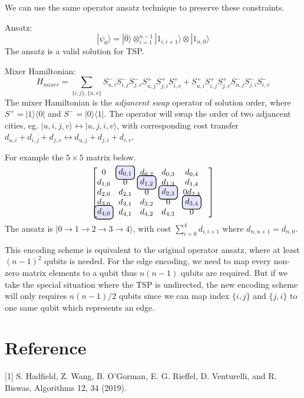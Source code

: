 \documentclass[%
aps, %
prl, %
preprint, %
12pt, %
amsfonts, %
amssymb, %
amsmath, %
endfloats,%
notitlepage, %
raggedbottom, %
]{revtex4-1}
\newcommand{\bra}[1]{|#1\rangle}
\newcommand\hlight[1]{\tikz[overlay, remember picture,baseline=-\the\dimexpr\fontdimen22\textfont2\relax]\node[rectangle,fill=blue!50,rounded corners,fill opacity = 0.2,draw,thick,text opacity =1] {$#1$};}
\begin{document}
We can use the same operator ansatz technique to preserve these constraints.

Ansatz:
$$
|\psi_0\rangle=|\bar 0\rangle \otimes_{i=1}^{n-1} |1_{i,i+1}\rangle\otimes\bra{1_{n,0}}
$$
The ansatz is a valid solution for TSP.

Mixer Hamiltonian:
$$
H_{mixer}=\sum_{\{i,j\},\{u,v\}} S^-_{u,i}S^-_{i,j}S^-_{j,v}S^+_{u,j}S^+_{j,i}S^+_{i,v}+S^+_{u,i}S^+_{i,j}S^+_{j,v}S^-_{u,j}S^-_{j,i}S^-_{i,v}
$$
The mixer Hamiltonian is the \textit{adjancent swap} operator of solution order, where $S^+=|1\rangle\langle 0|$ and $S^-=|0\rangle\langle 1|$.
The operator will swap the order of two adjancent cities, eg.
$|u,i,j,v\rangle \leftrightarrow |u,j,i,v\rangle$, with corresponding cost transfer $d_{u,i}+d_{i,j}+d_{j,v} \leftrightarrow d_{u,j}+d_{j,i}+d_{i,v}$.

For example the $5\times 5$ matrix below.
$$
\begin{bmatrix}
    0&\hlight{d_{0,1}}&d_{0,2}&d_{0,3}&d_{0,4}&\\
    d_{1,0}&0&\hlight{d_{1,2}}&d_{1,3}&d_{1,4}&\\
    d_{2,0}&d_{2,1}&0&\hlight{d_{2,3}}&0d_{2,4}&\\
    d_{3,0}&d_{3,1}&d_{3,2}&0&\hlight{d_{3,4}}&\\
    \hlight{d_{4,0}}&d_{4,1}&d_{4,2}&d_{4,3}&0&\\
\end{bmatrix}
$$
The ansatz is $\bra{0\rightarrow 1 \rightarrow 2\rightarrow 3\rightarrow 4}$, with cost $\sum_{i=0}^4 d_{i,i+1}$ where $d_{n,n+1}=d_{n,0}$.

This encoding scheme is equivalent to the original operator ansatz, where at least $(n-1)^2$ qubits is needed. For the edge encoding, we need to map every non-zero matrix elements to a qubit thus $n(n-1)$ qubits are required. But if we take the special situation where the TSP is undirected, the new encoding scheme will only requires $n(n-1)/2$ qubits since we can map index $\{i,j\}$ and $\{j,i\}$ to one same qubit which represents an edge.


\section{Reference}
[1] S. Hadfield, Z. Wang, B. O’Gorman, E. G. Rieffel, D. Venturelli, and R. Biswas, Algorithms 12, 34 (2019).
\end{document}
